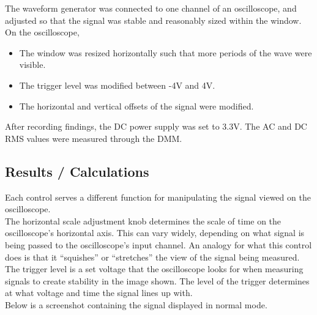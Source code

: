 \documentclass[notitlepage, 12pt]{report}  %
\begin{document}
The waveform generator was connected to one channel of an oscilloscope, and adjusted so that the signal 
was stable and reasonably sized within the window.\\


\noindent On the oscilloscope, 

\begin{itemize} %

    \item{The window was resized horizontally such that more periods of the wave were visible.}

    \item{The trigger level was modified between -4V and 4V.}

    \item{The horizontal and vertical offsets of the signal were modified.}
    
\end{itemize}

After recording findings, the DC power supply was set to 3.3V. The AC and DC RMS values were measured through 
the DMM.\\


\subsection*{Results / Calculations}

\indent\indent Each control serves a different function for manipulating the signal viewed on the oscilloscope. \\

The horizontal scale adjustment knob determines the scale of time on the oscilloscope's horizontal axis. 
This can vary widely, depending on what signal is being passed to the oscilloscope's input channel. 
An analogy for what this control does is that it ``squishes'' or ``stretches'' the view of the signal being measured. \\

The trigger level is a set voltage that the oscilloscope looks for when measuring signals to create stability in the
image shown. The level of the trigger determines at what voltage and time the signal lines up with.\\

Below is a screenshot containing the signal displayed in normal mode.
\end{document}
